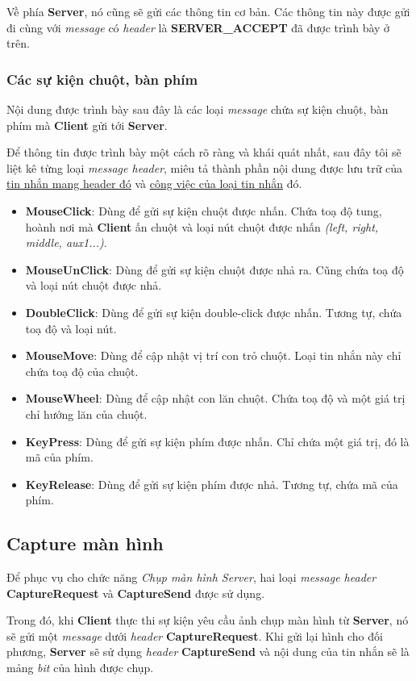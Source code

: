 Về phía \textbf{Server}, nó cũng sẽ gửi các thông tin cơ bản. Các thông tin này được gửi đi cùng với \textit{message} có  \textit{header} là \textbf{SERVER\_ACCEPT} đã được trình bày ở trên.

\subsubsection {Các sự kiện chuột, bàn phím}

Nội dung được trình bày sau đây là các loại \textit{message} chứa sự kiện chuột, bàn phím mà \textbf{Client} gửi tới \textbf{Server}.

Để thông tin được trình bày một cách rõ ràng và khái quát nhất, sau đây tôi sẽ liệt kê từng loại \textit{message header}, miêu tả thành phần nội dung được lưu trữ của \underline{tin nhắn mang header đó} và \underline{công việc của loại tin nhắn} đó.

\begin{itemize}
	\item \textbf{MouseClick}:  Dùng để gửi sự kiện chuột được nhấn. Chứa toạ độ tung, hoành nơi mà \textbf{Client} ấn chuột và loại nút chuột được nhấn \textit{(left, right, middle, aux1...)}.
	\item \textbf{MouseUnClick}: Dùng để gửi sự kiện chuột được nhả ra. Cũng chứa toạ độ và loại nút chuột được nhả.
	\item \textbf{DoubleClick}: Dùng để gửi sự kiện double-click được nhấn. Tương tự, chứa toạ độ và loại nút.
	\item \textbf{MouseMove}: Dùng để cập nhật vị trí con trỏ chuột. Loại tin nhắn này chỉ chứa toạ độ của chuột.
	\item \textbf{MouseWheel}: Dùng để cập nhật con lăn chuột. Chứa toạ độ và một giá trị chỉ hướng lăn của chuột.
	\item \textbf{KeyPress}: Dùng để gửi sự kiện phím được nhấn. Chỉ chứa một giá trị, đó là mã của phím.
	\item \textbf{KeyRelease}: Dùng để gửi sự kiện phím được nhả. Tương tự, chứa mã của phím.
\end{itemize}

\subsection{Capture màn hình}

Để phục vụ cho chức năng \textit{Chụp màn hình Server}, hai loại \textit{message header} \textbf{CaptureRequest} và \textbf{CaptureSend} được sử dụng.

Trong đó, khi \textbf{Client} thực thi sự kiện yêu cầu ảnh chụp màn hình từ \textbf{Server}, nó sẽ gửi một \textit{message} dưới \textit{header} \textbf{CaptureRequest}. Khi gửi lại hình cho đối phương, \textbf{Server} sẽ sử dụng \textit{header} \textbf{CaptureSend}  và nội dung của tin nhắn sẽ là mảng \textit{bit} của hình được chụp.


